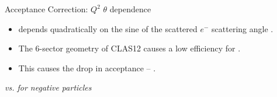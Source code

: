 \begin{frame}{Acceptance Correction: $Q^2$ $\theta$ dependence}
    \label{11.53::q2_theta_dependence}

    \begin{itemize}
        \item
             depends quadratically on the sine of the scattered $e^-$ scattering angle .

        \item
            The 6-sector geometry of CLAS12 causes a low efficiency for .

        \item
            This causes the drop in acceptance -- .
    \end{itemize}

    \begin{center}
        \begin{figure}[t]
        \end{figure}
        \scriptsize{\textit{\ef{$\varphi$} vs. \ef{$\theta$} for negative particles}}
    \end{center}
\end{frame}

